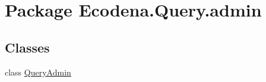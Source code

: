\hypertarget{namespace_ecodena_1_1_query_1_1admin}{
\section{Package Ecodena.Query.admin}
\label{d0/df0/namespace_ecodena_1_1_query_1_1admin}
}
\subsection*{Classes}
\begin{DoxyCompactItemize}
\item 
class \hyperlink{class_ecodena_1_1_query_1_1admin_1_1_query_admin}{QueryAdmin}
\end{DoxyCompactItemize}
